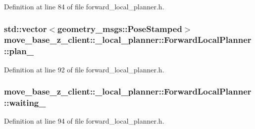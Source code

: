Definition at line 84 of file forward\+\_\+local\+\_\+planner.\+h.

\subsubsection[{\texorpdfstring{plan\+\_\+}{plan_}}]{\setlength{\rightskip}{0pt plus 5cm}std\+::vector$<$geometry\+\_\+msgs\+::\+Pose\+Stamped$>$ move\+\_\+base\+\_\+z\+\_\+client\+::\+\_\+local\+\_\+planner\+::\+Forward\+Local\+Planner\+::plan\+\_\+\hspace{0.3cm}{\ttfamily [private]}}\hypertarget{classmove__base__z__client_1_1__local__planner_1_1ForwardLocalPlanner_a8e3af765e599d21022e908a8ae4ddbc3}{}\label{classmove__base__z__client_1_1__local__planner_1_1ForwardLocalPlanner_a8e3af765e599d21022e908a8ae4ddbc3}


Definition at line 92 of file forward\+\_\+local\+\_\+planner.\+h.

\subsubsection[{\texorpdfstring{waiting\+\_\+}{waiting_}}]{ move\+\_\+base\+\_\+z\+\_\+client\+::\+\_\+local\+\_\+planner\+::\+Forward\+Local\+Planner\+::waiting\+\_\+\hspace{0.3cm}{\ttfamily [private]}}\hypertarget{classmove__base__z__client_1_1__local__planner_1_1ForwardLocalPlanner_aed51a2da927c96eb168a28ad06e01767}{}\label{classmove__base__z__client_1_1__local__planner_1_1ForwardLocalPlanner_aed51a2da927c96eb168a28ad06e01767}


Definition at line 94 of file forward\+\_\+local\+\_\+planner.\+h.


